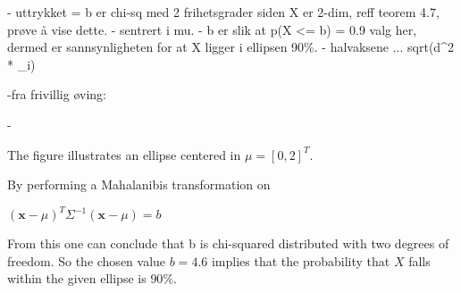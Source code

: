 - uttrykket = b er chi-sq med 2 frihetsgrader siden X er 2-dim, reff teorem 4.7, prøve å vise dette. 
- sentrert i mu.
- b er slik at p(X <= b) = 0.9 valg her, dermed er sannsynligheten for at X ligger i ellipsen 90\%. 
- halvaksene ... sqrt(d^2 * \lambda_i) 


-fra frivillig øving: 

- 

The figure illustrates an ellipse centered in $\mu = [0, 2]^T$. 

By performing a Mahalanibis transformation on 

$(\textbf{x}- {\mu})^T \Sigma^{-1} (\textbf{x}-{\mu})=b$ %

From this one can conclude that b is chi-squared distributed with two degrees of freedom. So the chosen value $b=4.6$ implies that the probability that $X$ falls within the given ellipse is $90\%$. 